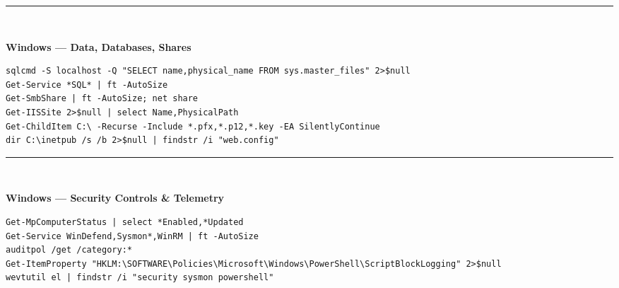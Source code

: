 \documentclass[9pt,landscape]{article}
\newcommand{\colorsec}[2]{%
  \vspace{0.8ex plus 0.3ex minus 0.3ex}%
  \noindent\rule{\linewidth}{0.4pt}\\[-0.8ex]%
  \noindent\colorbox{#1}{\parbox{\dimexpr\linewidth-2\fboxsep}{%
    \strut\textbf{\small\color{sblue} #2}}}%
  \vspace{0.3ex}\par\nobreak%
}
\begin{document}
\begin{multicols}{2}
\colorsec{secorange}{Windows --- Data, Databases, Shares}
\begin{lstlisting}
sqlcmd -S localhost -Q "SELECT name,physical_name FROM sys.master_files" 2>$null
Get-Service *SQL* | ft -AutoSize
Get-SmbShare | ft -AutoSize; net share
Get-IISSite 2>$null | select Name,PhysicalPath
Get-ChildItem C:\ -Recurse -Include *.pfx,*.p12,*.key -EA SilentlyContinue
dir C:\inetpub /s /b 2>$null | findstr /i "web.config"
\end{lstlisting}

\colorsec{secred}{Windows --- Security Controls \& Telemetry}
\begin{lstlisting}
Get-MpComputerStatus | select *Enabled,*Updated
Get-Service WinDefend,Sysmon*,WinRM | ft -AutoSize
auditpol /get /category:*
Get-ItemProperty "HKLM:\SOFTWARE\Policies\Microsoft\Windows\PowerShell\ScriptBlockLogging" 2>$null
wevtutil el | findstr /i "security sysmon powershell"
\end{lstlisting}

\end{multicols}
\end{document}
